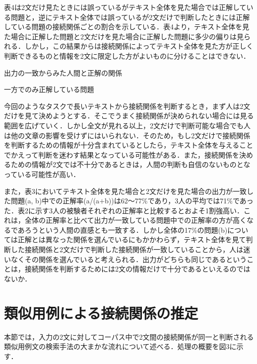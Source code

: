\documentclass[japanese]{jnlp_1.4}
\begin{document}
表4は2文だけ見たときには誤っているがテキスト全体を見た場合では正解している問題と，逆にテキスト全体では誤っているが2文だけで判断したときには正解している問題の接続関係ごとの割合を示している．表4より，テキスト全体を見た場合に正解した問題と2文だけを見た場合に正解した問題に多少の偏りは見られる．しかし，この結果からは接続関係によってテキスト全体を見た方が正しく判断できるものと情報を2文に限定した方がよいものに分けることはできない．

\begin{table}[t]
\begin{minipage}[t]{190pt}
\caption{出力の一致からみた人間と正解の関係}

\end{minipage}
\hfill
\begin{minipage}[t]{200pt}
\caption{一方でのみ正解している問題}

\end{minipage}
\end{table}

今回のようなタスクで長いテキストから接続関係を判断するとき，まず人は2文だけを見て決めようとする．そこでうまく接続関係が決められない場合には見る範囲を広げていく．しかし全文が見れる以上，2文だけで判断可能な場合でも人は他の文章の影響を受けずにはいられない．そのため，もし2文だけで接続関係を判断するための情報が十分含まれているとしたら，テキスト全体を与えることでかえって判断を迷わす結果となっている可能性がある．また，接続関係を決めるための情報が2文では不十分であるときは，人間の判断も自信のないものとなっている可能性が高い．

また，表3においてテキスト全体を見た場合と2文だけを見た場合の出力が一致した問題(a, b)中での正解率(a/(a$+$b))は62〜77{\%}であり，3人の平均では71{\%}であった．表2に示す3人の被験者それぞれの正解率と比較するとおよそ1割強高い．これは，全体の正解率と比べて出力が一致している問題中での正解率の方が高くなるであろうという人間の直感とも一致する．しかし全体の17\%の問題(b)については正解とは異なった関係を選んでいるにもかかわらず，テキスト全体を見て判断した接続関係と2文だけで判断した接続関係が一致していることから，人は迷いなくその関係を選んでいると考えられる．出力がどちらも同じであるということは，接続関係を判断するためには2文の情報だけで十分であるといえるのではないか．


\section{類似用例による接続関係の推定}

本節では，入力の2文に対してコーパス中で2文間の接続関係が同一と判断される類似用例文の検索手法の大まかな流れについて述べる．処理の概要を図3に示す．
\end{document}
